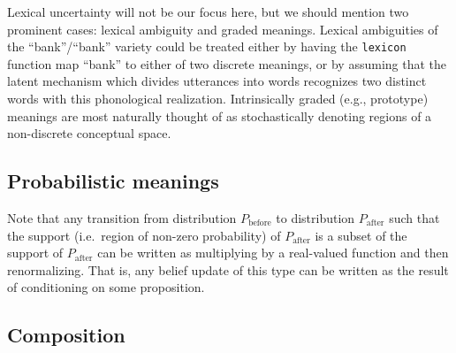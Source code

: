 \documentclass[12pt]{article}
\begin{document}
Lexical uncertainty will not be our focus here, but we should mention two prominent cases: lexical ambiguity and graded meanings. 
Lexical ambiguities of the ``bank''/``bank'' variety could be treated either by having the \lstinline{lexicon} function map ``bank'' to either of two discrete meanings, or by assuming that the latent mechanism which divides utterances into words recognizes two distinct words with this phonological realization.
Intrinsically graded (e.g., prototype) meanings are most naturally thought of as stochastically denoting regions of a non-discrete conceptual space. 

\subsection{Probabilistic meanings}
Note that any transition from distribution $P_{\text{before}}$ to distribution $P_{\text{after}}$ such that the support (i.e.\ region of non-zero probability) of $P_{\text{after}}$ is a subset of the support of $P_{\text{after}}$ can be written as multiplying by a real-valued function and then renormalizing. 
That is, any belief update of this type can be written as the result of conditioning on some proposition.


\subsection{Composition}



\end{document}
